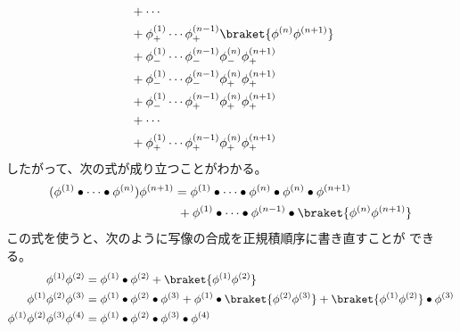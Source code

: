 {\begin{todo}[Wickの定理]
\begin{equation*}
\begin{split}
			&\;+ \cdots \\
			&\;+ \phi_+^{(1)}\cdots\phi_+^{(n-1)}\braket{\phi^{(n)}\phi^{(n+1)}} \\
			&\;+ \phi_-^{(1)}\cdots\phi_-^{(n-1)}\phi_-^{(n)}\phi_+^{(n+1)} \\
			&\;+ \phi_-^{(1)}\cdots\phi_-^{(n-1)}\phi_+^{(n)}\phi_+^{(n+1)} \\
			&\;+ \phi_-^{(1)}\cdots\phi_+^{(n-1)}\phi_+^{(n)}\phi_+^{(n+1)} \\
			&\;+ \cdots \\
			&\;+ \phi_+^{(1)}\cdots\phi_+^{(n-1)}\phi_+^{(n)}\phi_+^{(n+1)} \\
		\end{split}\end{equation*}
		したがって、次の式が成り立つことがわかる。
		\begin{equation*}\begin{split}
			(\phi^{(1)}\bullet\cdots\bullet\phi^{(n)})
				\phi^{(n+1)}
			&= \phi^{(1)}\bullet\cdots\bullet\phi^{(n)}\bullet\phi^{(n)}
				\bullet\phi^{(n+1)} \\
			&\;+ \phi^{(1)}\bullet\cdots\bullet\phi^{(n-1)}
				\bullet\braket{\phi^{(n)}\phi^{(n+1)}} \\
		\end{split}\end{equation*}
		この式を使うと、次のように写像の合成を正規積順序に書き直すことが
		できる。
		\begin{equation*}\begin{split}
			\phi^{(1)}\phi^{(2)} &= \phi^{(1)}\bullet\phi^{(2)} 
				+ \braket{\phi^{(1)}\phi^{(2)}} \\
			\phi^{(1)}\phi^{(2)}\phi^{(3)}
			&= \phi^{(1)}\bullet\phi^{(2)}\bullet\phi^{(3)} 
				+ \phi^{(1)}\bullet\braket{\phi^{(2)}\phi^{(3)}}
				+ \braket{\phi^{(1)}\phi^{(2)}}\bullet\phi^{(3)} \\
			\phi^{(1)}\phi^{(2)}\phi^{(3)}\phi^{(4)}
			&= \phi^{(1)}\bullet\phi^{(2)}\bullet\phi^{(3)}\bullet\phi^{(4)} \\

\end{split}
\end{equation*}
\end{todo}}
